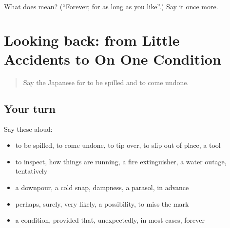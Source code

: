 \begin{tcolorbox}[breakable,colback=teal!4,colframe=teal!35!black,title={Before you move on}]
What does  mean? (\textquotedblleft{}Forever; for as long as you like\textquotedblright{}.) Say it once more.
\end{tcolorbox}
\section[(dialogue)]{Looking back: from Little Accidents to On One Condition}

\label{lesson:JA-R356-review-352-356}



\begin{quote}
Say the Japanese for to be spilled and to come undone.
\end{quote}

\subsection*{Your turn}
Say these aloud:

\begin{itemize}
\raggedright
  \item to be spilled, to come undone, to tip over, to slip out of place, a tool
  \item to inspect, how things are running, a fire extinguisher, a water outage, tentatively
  \item a downpour, a cold snap, dampness, a parasol, in advance
  \item perhaps, surely, very likely, a possibility, to miss the mark
  \item a condition, provided that, unexpectedly, in most cases, forever
\end{itemize}

